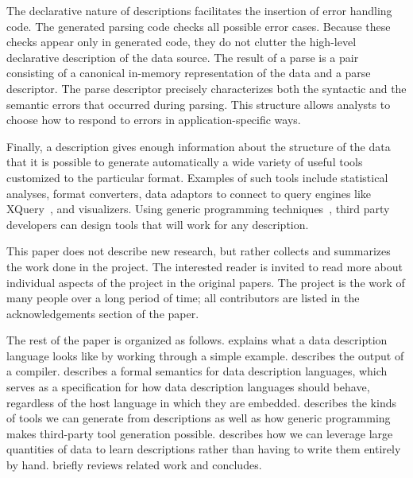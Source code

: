 \documentclass{sig-alternate}
\begin{document}

The declarative nature of \pads{} descriptions facilitates the
insertion of error handling code.  The generated parsing code checks
all possible error cases.  Because these checks appear only in
generated code, they do not clutter the high-level declarative
description of the data source.  The result of a parse is a pair
consisting of a canonical in-memory representation of the data and a
parse descriptor. The parse descriptor precisely characterizes both
the syntactic and the semantic errors that occurred during parsing.
This structure allows analysts to choose how to respond to errors in
application-specific ways.

Finally, a \pads{} description gives enough information about the
structure of the data that it is possible to generate automatically a
wide variety of useful tools customized to the particular format.
Examples of such tools include statistical analyses, format
converters, data adaptors to connect to query engines like
XQuery~\cite{fernandez+:padx}, and visualizers.  Using generic
programming techniques~\cite{fernandez+:padl,Lammel+:syb,mandelbaum+:pads-ml},
third party developers can design tools that will work for any \pads{}
description.



This paper does not describe new research, but rather collects and
summarizes the work done in the \pads{} project. The interested reader
is invited to read more about individual aspects of the project in the
original papers.  The project is the work of many people over a long
period of time; all contributors are listed in the acknowledgements
section of the paper.

The rest of the paper is organized as follows. 
explains what a \pads{} data description language looks like by
working through a simple example.  describes the
output of a \pads{} compiler.   describes a formal
semantics for data description languages, which serves as a
specification for how \pads{} data description languages should
behave, regardless of the host language in which they are embedded.
 describes the kinds of tools we can generate from
\pads{} descriptions as well as how generic programming makes third-party
tool generation possible.   describes how we can
leverage large quantities of data to learn \pads{} descriptions rather
than having to write them entirely by hand.   briefly
reviews related work and 
concludes.
\end{document}
